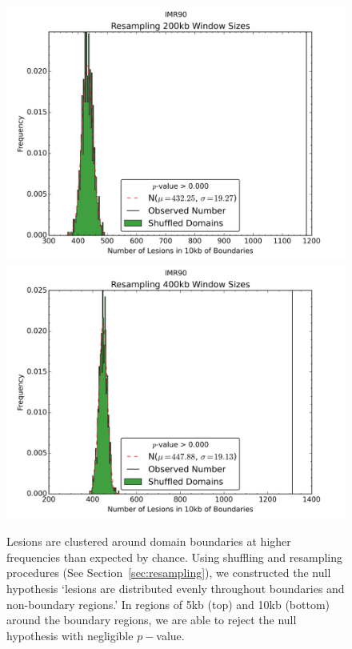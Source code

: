 \begin{figure}[H]
  \vfill

  \begin{minipage}{0.5\textwidth}%
    \includegraphics[width=\textwidth]{./figures/supplementary/domains/IMR90boundaries200kbwindows10000kbslop.png}
  \end{minipage}%
  \hfill
  \begin{minipage}{0.5\textwidth}
    \centering
    \includegraphics[width=\textwidth]{./figures/supplementary/domains/IMR90boundaries400kbwindows10000kbslop.png}
  \end{minipage}
  \medskip
  \small
  Lesions are clustered around domain boundaries at higher frequencies than expected by chance.  Using shuffling and
  resampling procedures (See Section~\ref{sec:resampling}), we constructed the null hypothesis `lesions are distributed evenly
  throughout boundaries and non-boundary regions.'  In regions of 5kb (top) and 10kb (bottom) around the boundary regions, we are
  able to reject the null hypothesis with negligible $p-$value.
\end{figure}
